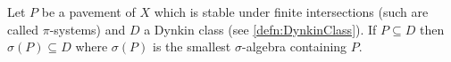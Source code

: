 \begin{thm}
  Let $P$ be a pavement of $X$ which is stable under finite intersections
  (such are called $\pi$-systems) and $D$ a Dynkin class
  (see \cref{defn:DynkinClass}).
  If $P \subseteq D$ then $\sigma(P) \subseteq D$
  where $\sigma(P)$ is the smallest $\sigma$-algebra containing $P$.
  \label{thm:DynkinPiLambda}
\end{thm}


